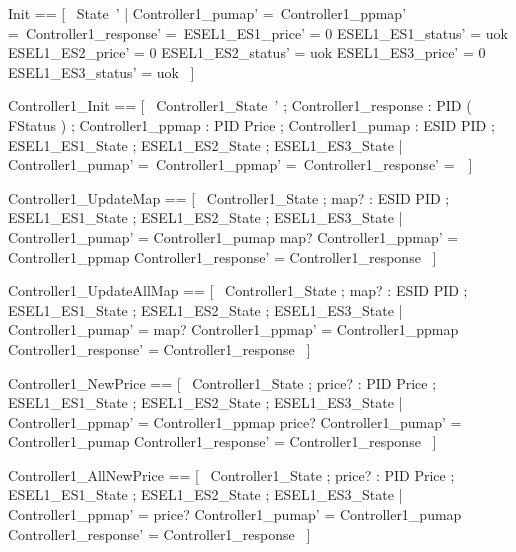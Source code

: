 \documentclass{article}
\begin{document}
\begin{zed}
	Init == [~  State~' | Controller1\_pumap' =~\emptyset \land Controller1\_ppmap' =~\emptyset \land Controller1\_response' =~\emptyset \land ESEL1\_ES1\_price' = 0 \land ESEL1\_ES1\_status' = uok \land ESEL1\_ES2\_price' = 0 \land ESEL1\_ES2\_status' = uok \land ESEL1\_ES3\_price' = 0 \land ESEL1\_ES3\_status' = uok  ~]
\end{zed}

\begin{zed}
	Controller1\_Init == [~  Controller1\_State~' ; Controller1\_response : PID \pfun ( \power FStatus ) ; Controller1\_ppmap : PID \pfun Price ; Controller1\_pumap : ESID \pfun PID ; \Xi ESEL1\_ES1\_State ; \Xi ESEL1\_ES2\_State ; \Xi ESEL1\_ES3\_State | Controller1\_pumap' =~\emptyset \land Controller1\_ppmap' =~\emptyset \land Controller1\_response' =~\emptyset  ~]
\end{zed}

\begin{zed}
	Controller1\_UpdateMap == [~  \Delta Controller1\_State ; map? : ESID \pfun PID ; \Xi ESEL1\_ES1\_State ; \Xi ESEL1\_ES2\_State ; \Xi ESEL1\_ES3\_State | Controller1\_pumap' = Controller1\_pumap \oplus map? \land Controller1\_ppmap' = Controller1\_ppmap \land Controller1\_response' = Controller1\_response  ~]
\end{zed}

\begin{zed}
	Controller1\_UpdateAllMap == [~  \Delta Controller1\_State ; map? : ESID \pfun PID ; \Xi ESEL1\_ES1\_State ; \Xi ESEL1\_ES2\_State ; \Xi ESEL1\_ES3\_State | Controller1\_pumap' = map? \land Controller1\_ppmap' = Controller1\_ppmap \land Controller1\_response' = Controller1\_response  ~]
\end{zed}

\begin{zed}
	Controller1\_NewPrice == [~  \Delta Controller1\_State ; price? : PID \pfun Price ; \Xi ESEL1\_ES1\_State ; \Xi ESEL1\_ES2\_State ; \Xi ESEL1\_ES3\_State | Controller1\_ppmap' = Controller1\_ppmap \oplus price? \land Controller1\_pumap' = Controller1\_pumap \land Controller1\_response' = Controller1\_response  ~]
\end{zed}

\begin{zed}
	Controller1\_AllNewPrice == [~  \Delta Controller1\_State ; price? : PID \pfun Price ; \Xi ESEL1\_ES1\_State ; \Xi ESEL1\_ES2\_State ; \Xi ESEL1\_ES3\_State | Controller1\_ppmap' = price? \land Controller1\_pumap' = Controller1\_pumap \land Controller1\_response' = Controller1\_response  ~]
\end{zed}
\end{document}
